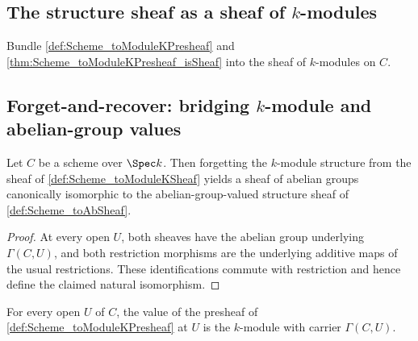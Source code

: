\subsection{The structure sheaf as a sheaf of \(k\)-modules}

\begin{definition}\leanok
  \label{def:Scheme_toModuleKSheaf}

  Bundle \cref{def:Scheme_toModuleKPresheaf} and \cref{thm:Scheme_toModuleKPresheaf_isSheaf} into the sheaf of \(k\)-modules on \(C\).
\end{definition}

\subsection{Forget-and-recover: bridging \(k\)-module and abelian-group values}

\begin{definition}\leanok
  \label{def:Scheme_toModuleKSheaf_forgetCompare}

  Let \(C\) be a scheme over \(\Spec k\). Then forgetting the \(k\)-module structure from the sheaf of \cref{def:Scheme_toModuleKSheaf} yields a sheaf of abelian groups canonically isomorphic to the abelian-group-valued structure sheaf of \cref{def:Scheme_toAbSheaf}.
\end{definition}

\begin{proof}

  \leanok
  At every open \(U\), both sheaves have the abelian group underlying \(\Gamma(C,U)\), and both restriction morphisms are the underlying additive maps of the usual restrictions. These identifications commute with restriction and hence define the claimed natural isomorphism.
\end{proof}

\begin{lemma}\leanok
  \label{lem:Scheme_toModuleKPresheaf_obj}

  For every open \(U\) of \(C\), the value of the presheaf of \cref{def:Scheme_toModuleKPresheaf} at \(U\) is the \(k\)-module with carrier \(\Gamma(C, U)\).
\end{lemma}

